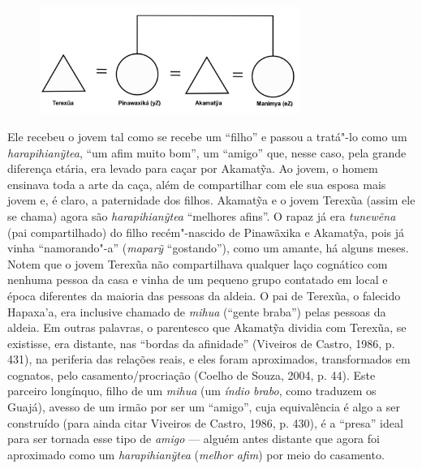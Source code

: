 \begin{figure}[H]
\centering
  \includegraphics[width=85mm]{./imgs/Figura_10_crop}
\end{figure}


Ele recebeu o jovem tal como se recebe um ``filho'' e passou a tratá"-lo
como um \emph{harapihianỹtea}, ``um afim muito bom'', um ``amigo'' que,
nesse caso, pela grande diferença etária, era levado para caçar por
Akamatỹa. Ao jovem, o homem ensinava toda a arte da caça, além de
compartilhar com ele sua esposa mais jovem e, é claro, a paternidade dos
filhos. Akamatỹa e o jovem Terexũa (assim ele se chama) agora são
\emph{harapihianỹtea} ``melhores afins''. O rapaz já era \emph{tunewẽna}
(pai compartilhado) do filho recém"-nascido de Pinawãxika e Akamatỹa,
pois já vinha ``namorando"-a'' (\emph{maparỹ} ``gostando''), como um
amante, há alguns meses. Notem que o jovem Terexũa não compartilhava
qualquer laço cognático com nenhuma pessoa da casa e vinha de um pequeno
grupo contatado em local e época diferentes da maioria das pessoas da
aldeia. O pai de Terexũa, o falecido Hapaxa'a, era inclusive chamado de
\emph{mihua} (``gente braba'') pelas pessoas da aldeia. Em outras
palavras, o parentesco que Akamatỹa dividia com Terexũa, se existisse,
era distante, nas ``bordas da afinidade'' (Viveiros de Castro, 1986,
p. 431), na periferia das relações reais, e eles foram aproximados,
transformados em cognatos, pelo casamento/procriação (Coelho de Souza,
2004, p. 44). Este parceiro longínquo, filho de um \emph{mihua} (um
\emph{índio} \emph{brabo}, como traduzem os Guajá), avesso de um irmão
por ser um ``amigo'', cuja equivalência é algo a ser construído (para
ainda citar Viveiros de Castro, 1986, p. 430), é a ``presa'' ideal para
ser tornada esse tipo de \emph{amigo} --- alguém antes distante que agora
foi aproximado como um \emph{harapihianỹtea} (\emph{melhor afim}) por
meio do casamento.

